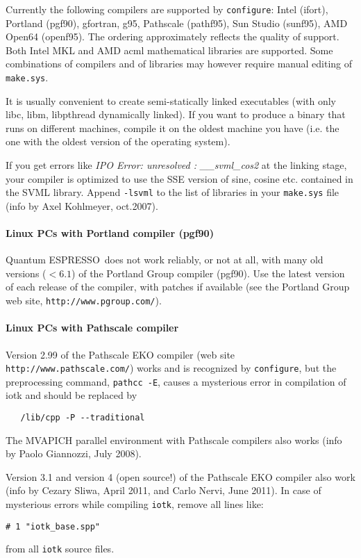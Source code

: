 \documentclass[12pt,a4paper]{article}
\def\qe{{\sc Quantum ESPRESSO}}
\def\configure{\texttt{configure}}
\begin{document}
Currently the following compilers are supported by \configure:
Intel (ifort), Portland (pgf90), gfortran, g95, Pathscale (pathf95), 
Sun Studio (sunf95),  AMD Open64 (openf95). The ordering approximately
reflects the quality of support. Both Intel MKL and AMD acml mathematical
libraries are supported. Some combinations of compilers and of libraries
may however require manual editing of \texttt{make.sys}.

It is usually convenient to create semi-statically linked executables (with only
libc, libm, libpthread dynamically linked). If you want to produce a binary
that runs on different machines, compile it on the oldest machine you have
(i.e. the one with the oldest version of the operating system).

If you get errors like {\em IPO Error: unresolved : \_\_svml\_cos2}
at the linking stage, your compiler is optimized to use the SSE
version of sine, cosine etc. contained in the SVML library. Append
\texttt{-lsvml} to the list of libraries in your \texttt{make.sys} file (info by Axel
Kohlmeyer, oct.2007). 

\paragraph{Linux PCs with Portland compiler (pgf90)}

\qe\ does not work reliably, or not at all, with many old
versions ($< 6.1$) of the Portland Group compiler (pgf90).
 Use the latest version of each 
release of the compiler, with patches if available (see
the Portland Group web site, \texttt{http://www.pgroup.com/}).

\paragraph{Linux PCs with Pathscale compiler}

Version 2.99 of the Pathscale EKO compiler (web site
\texttt{http://www.pathscale.com/})
works and is recognized by
\configure, but the preprocessing command, \texttt{pathcc -E},
causes a mysterious error in compilation of iotk and should be replaced by
\begin{verbatim}
   /lib/cpp -P --traditional
\end{verbatim}
The MVAPICH parallel environment with Pathscale compilers also works
(info by Paolo Giannozzi, July 2008). 

Version 3.1 and version 4 (open source!) of the Pathscale EKO compiler
also work (info by Cezary Sliwa, April 2011, and Carlo Nervi, June 2011).
In case of mysterious errors while compiling \texttt{iotk},
remove all lines like:
\begin{verbatim}
# 1 "iotk_base.spp"
\end{verbatim}
from all \texttt{iotk} source files.
\end{document}
